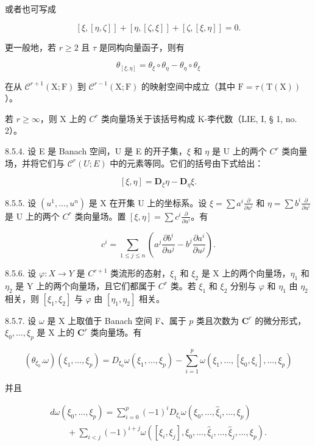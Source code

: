 或者也可写成

\[
[ \xi , [ \eta , \zeta ] ] + [ \eta , [ \zeta , \xi ] ] + [ \zeta , [ \xi , \eta ] ] = 0.
\]

更一般地，若 \(r \geqslant 2\) 且 \(\tau\) 是同构向量函子，则有

\[
\theta_ {[ \xi , \eta ]} = \theta_ {\xi} \circ \theta _ {\eta} - \theta _ {\eta} \circ \theta_ {\xi}\tag{5}
\]

在从 \(\mathcal{C}^{r+1}(\mathrm{X};\mathrm{F})\) 到 \(\mathcal{C}^{r-1}(\mathrm{X};\mathrm{F})\) 的映射空间中成立（其中 \(\mathrm{F} = \tau (\mathrm{T}(\mathrm{X}))\)）。

若 \(r \geqslant \infty\)，则 X 上的 \(C^r\) 类向量场关于该括号构成 K-李代数（LIE, I, § 1, no. 2）。

8.5.4. 设 E 是 Banach 空间，U 是 E 的开子集，\(\xi\) 和 \(\eta\) 是 U 上的两个 \(C^{r}\) 类向量场，并将它们与 \(\mathcal{C}^{r}(U;E)\) 中的元素等同。它们的括号由下式给出：

\[
[ \xi , \eta ] = \mathbf {D} _ {\xi} \eta - \mathbf {D} _ {\eta} \xi .\tag{6}
\]

8.5.5. 设 \((u^1, \ldots, u^n)\) 是 X 在开集 U 上的坐标系。设 \(\xi = \sum a^i \frac{\partial}{\partial u^i}\) 和 \(\eta = \sum b^i \frac{\partial}{\partial u^i}\) 是 U 上的两个 \(C^r\) 类向量场。置 \([\xi, \eta] = \sum c^i \frac{\partial}{\partial u^i}\)。有

\[
c ^ {i} = \sum_ {1 \leqslant j \leqslant n} \left(a ^ {j} \frac {\partial b ^ {i}}{\partial u ^ {j}} - b ^ {j} \frac {\partial a ^ {i}}{\partial u ^ {j}}\right).\tag{7}
\]

8.5.6. 设 \(\varphi: X \to Y\) 是 \(C^{r+1}\) 类流形的态射，\(\xi_1\) 和 \(\xi_2\) 是 X 上的两个向量场，\(\eta_{1}\) 和 \(\eta_{2}\) 是 Y 上的两个向量场，且它们都属于 \(C^r\) 类。若 \(\xi_{1}\) 和 \(\xi_{2}\) 分别与 \(\varphi\) 和 \(\eta_{1}\) 由 \(\eta_{2}\) 相关，则 \([\xi_{1}, \xi_{2}]\) 与 \(\varphi\) 由 \([\eta_{1}, \eta_{2}]\) 相关。

8.5.7. 设 \(\omega\) 是 X 上取值于 Banach 空间 F、属于 \(p\) 类且次数为 \(\mathbf{C}^r\) 的微分形式，\(\xi_0, \ldots, \xi_p\) 是 X 上的 \(\mathbf{C}^r\) 类向量场。有

\[
(\theta_ {\xi_ {0}}. \omega) (\xi_ {1}, \dots , \xi_ {p}) = D _ {\xi_ {0}} \omega (\xi_ {1}, \dots , \xi_ {p}) - \sum_ {i = 1} ^ {p} \omega (\xi_ {1}, \dots , [ \xi_ {0}, \xi_ {i} ], \dots , \xi_ {p})\tag{8}
\]

并且

\[
\begin{array}{l} d \omega (\xi_ {0}, \dots , \xi_ {p}) = \sum_ {i = 0} ^ {p} (- 1) ^ {i} D _ {\xi_ {i}} \omega (\xi_ {0}, \dots , \hat {\xi} _ {i}, \dots , \xi_ {p}) \\ \qquad + \sum_ {i <   j} (- 1) ^ {i + j} \omega ([ \xi_ {i}, \xi_ {j} ], \xi_ {0}, \dots , \hat {\xi} _ {i}, \dots , \hat {\xi} _ {j}, \dots , \xi_ {p}). \end{array}\tag{9}
\]

